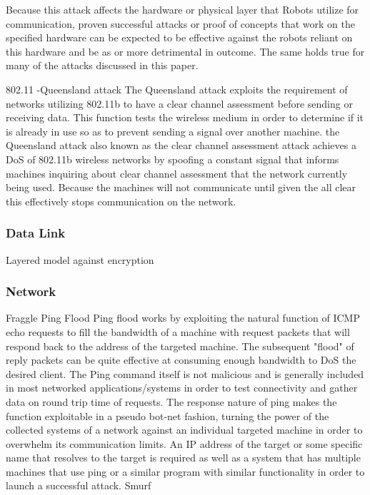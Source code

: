 Because this attack affects the hardware or physical layer that Robots utilize for communication, proven successful attacks or proof of concepts that work on the specified hardware can be expected to be effective against the robots reliant on this hardware and be as or more detrimental in outcome. The same holds true for many of the attacks discussed in this paper. 

802.11%
-Queensland attack
The Queensland attack exploits the requirement of networks utilizing 802.11b to have a clear channel assessment before sending or receiving data.  This function tests the wireless medium in order to determine if it is already in use so as to prevent sending a signal over another machine.  the Queensland attack also known as the clear channel assessment attack achieves a DoS of 802.11b wireless networks by spoofing a constant signal that informs machines inquiring about clear channel assessment that the network currently being used.  Because the machines will not communicate until given the all clear this effectively stops communication on the network. 
\subsubsection{Data Link}

Layered model against encryption
\subsubsection{Network}
Fraggle
Ping Flood
Ping flood works by exploiting the natural function of ICMP echo requests to fill the bandwidth of a machine with request packets that will respond back to the address of the targeted machine. The subsequent "flood" of reply packets can be quite effective at consuming enough bandwidth to DoS the desired client.  The Ping command itself is not malicious and is generally included in most networked applications/systems in order to test connectivity and gather data on round trip time of requests.  The response nature of ping makes the function exploitable in a pseudo bot-net fashion, turning the power of the collected systems of a network against an individual targeted machine in order to overwhelm its communication limits.  An IP address of the target or some specific name that resolves to the target is required as well as a system that has multiple machines that use ping or a similar program with similar functionality in order to launch a successful attack.  
Smurf

